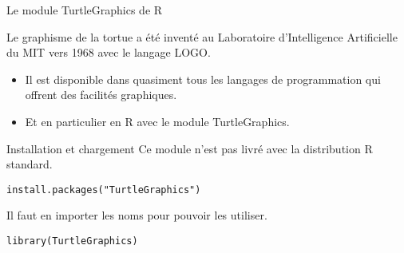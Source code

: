 \documentclass[10pt]{beamer}
\begin{document}
\begin{frame}[fragile]{Le module TurtleGraphics de R}

  Le \alert{graphisme de la tortue} a été inventé au Laboratoire d'Intelligence Artificielle du MIT vers 1968 avec le langage LOGO.
  \begin{itemize}
  \item Il est disponible dans quasiment tous les langages de programmation qui offrent des facilités graphiques.
  \item Et en particulier en R avec le module \alert{TurtleGraphics}.
  \end{itemize}

  \begin{block}{Installation et chargement}
    Ce module n’est pas livré avec la distribution R standard.
    \begin{lstlisting}
install.packages("TurtleGraphics")
\end{lstlisting}


Il faut en importer les noms pour pouvoir les utiliser.
    \begin{lstlisting}
library(TurtleGraphics)
\end{lstlisting}
\end{block}

\end{frame}
\end{document}
